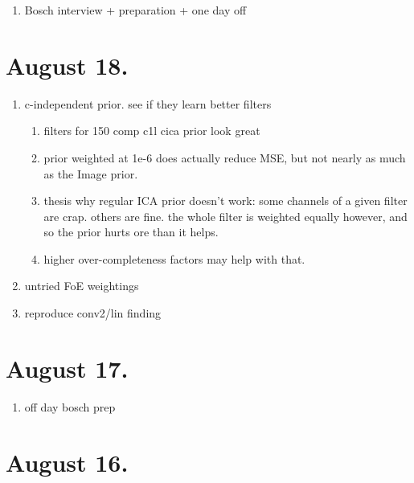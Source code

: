 \documentclass{article}
\begin{document}
\begin{enumerate}
	\item Bosch interview + preparation + one day off
\end{enumerate}


\section{August 18.}

\begin{enumerate}
	\item c-independent prior. see if they learn better filters
	\begin{enumerate}
		\item filters for 150 comp c1l cica prior look great
		\item prior weighted at 1e-6 does actually reduce MSE, but not nearly as much as the Image prior.
		\item thesis why regular ICA prior doesn't work: some channels of a given filter are crap. others are fine. the whole filter is weighted equally however, and so the prior hurts ore than it helps.
		\item higher over-completeness factors may help with that.
	\end{enumerate}
	\item untried FoE weightings
	\item reproduce conv2/lin finding
\end{enumerate}



\section{August 17.}

\begin{enumerate}
	\item off day bosch prep
\end{enumerate}


\section{August 16.}
\end{document}
